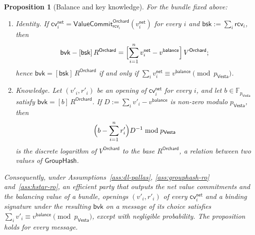 \documentclass[11pt,a4paper]{article}
\newtheorem{proposition}[theorem]{Proposition}
\theoremstyle{definition}
\newcommand{\F}{\mathbb{F}}
\newcommand{\cvsym}{\mathsf{cv}}
\newcommand{\Vesta}{\ensuremath{\mathsf{Vesta}}}
\newcommand{\GroupHash}{\ensuremath{\mathsf{GroupHash}}}
\newcommand{\rcv}{\ensuremath{\mathsf{rcv}}}
\begin{document}
\begin{proposition}[Balance and key knowledge]\label{prop:bvk}
For the bundle fixed above:
\begin{enumerate}
\item[(i)] Identity. If $\cvsym^{\mathsf{net}}_i =
  \mathsf{ValueCommit}^{\mathsf{Orchard}}_{\rcv_i}(v^{\mathsf{net}}_i)$ for
  every $i$ and $\mathsf{bsk} := \sum_i \rcv_i$, then
  \[
    \mathsf{bvk} - [\mathsf{bsk}]\,R^{\mathsf{Orchard}}
      = \Bigl[\sum_{i=1}^{n} v^{\mathsf{net}}_i - v^{\mathsf{balance}}\Bigr]
        \,V^{\mathsf{Orchard}};
  \]
  hence $\mathsf{bvk} = [\mathsf{bsk}]\,R^{\mathsf{Orchard}}$ if and only if
  $\sum_i v^{\mathsf{net}}_i \equiv v^{\mathsf{balance}}
  \pmod{p_{\Vesta}}$.
\item[(ii)] Knowledge. Let $(v'_i, r'_i)$ be an opening of
  $\cvsym^{\mathsf{net}}_i$ for every $i$, and let $b \in \F_{p_{\Vesta}}$
  satisfy $\mathsf{bvk} = [b]\,R^{\mathsf{Orchard}}$. If
  $D := \sum_i v'_i - v^{\mathsf{balance}}$ is non-zero modulo $p_{\Vesta}$,
  then
  \[
    \Bigl(b - \sum_{i=1}^{n} r'_i\Bigr) D^{-1} \bmod p_{\Vesta}
  \]
  is the discrete logarithm of $V^{\mathsf{Orchard}}$ to the base
  $R^{\mathsf{Orchard}}$, a relation between two values of $\GroupHash$.
\end{enumerate}
Consequently, under Assumptions~\ref{ass:dl-pallas}, \ref{ass:grouphash-ro}
and~\ref{ass:hstar-ro}, an efficient party that outputs the net value
commitments and the balancing value of a bundle, openings $(v'_i, r'_i)$ of
every $\cvsym^{\mathsf{net}}_i$ and a binding signature under the resulting
$\mathsf{bvk}$ on a message of its choice satisfies
$\sum_i v'_i \equiv v^{\mathsf{balance}} \pmod{p_{\Vesta}}$, except with
negligible probability. The proposition holds for every message.
\end{proposition}
\end{document}
